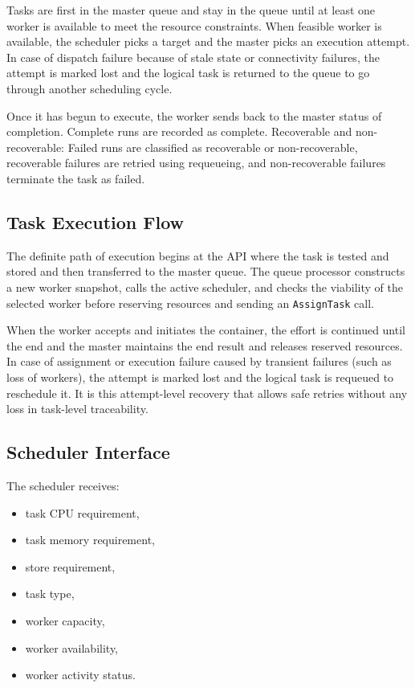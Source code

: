 Tasks are first in the master queue and stay in the queue until at least one worker is available to meet the resource constraints. When feasible worker is available, the scheduler picks a target and the master picks an execution attempt. In case of dispatch failure because of stale state or connectivity failures, the attempt is marked lost and the logical task is returned to the queue to go through another scheduling cycle.

Once it has begun to execute, the worker sends back to the master status of completion. Complete runs are recorded as complete. Recoverable and non-recoverable: Failed runs are classified as recoverable or non-recoverable, recoverable failures are retried using requeueing, and non-recoverable failures terminate the task as failed.

\subsection{Task Execution Flow}

The definite path of execution begins at the API where the task is tested and stored and then transferred to the master queue. The queue processor constructs a new worker snapshot, calls the active scheduler, and checks the viability of the selected worker before reserving resources and sending an \texttt{AssignTask} call.

When the worker accepts and initiates the container, the effort is continued until the end and the master maintains the end result and releases reserved resources. In case of assignment or execution failure caused by transient failures (such as loss of workers), the attempt is marked lost and the logical task is requeued to reschedule it. It is this attempt-level recovery that allows safe retries without any loss in task-level traceability.

\subsection{Scheduler Interface}

The scheduler receives:

\begin{itemize}
    \item task CPU requirement,
    \item task memory requirement,
    \item store requirement,
    \item task type,
    \item worker capacity,
    \item worker availability,
    \item worker activity status.
\end{itemize}

